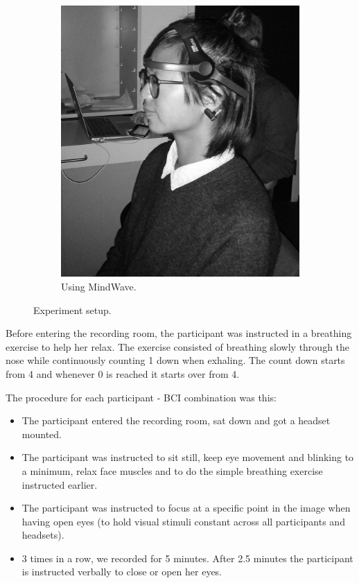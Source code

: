 \documentclass[a4paper,10pt,english,lof,lot,twoside]{puthesis}
\begin{document}
\begin{figure}
\begin{subfigure}[t]{0.35\linewidth}
\includegraphics[width=0.700\linewidth]{experiment-setup-w-mindwave.jpg}
\caption[Using MindWave.]{Using MindWave.}\label{ch-experiment/index:fig-experiment-setup-w-mindwave}\end{subfigure}
\caption[Experiment setup]{Experiment setup.}\label{ch-experiment/index:fig-experiment-setup}

\end{figure}


Before entering the recording room, the participant was instructed in a
breathing exercise to help her relax. The exercise consisted of breathing slowly
through the nose while continuously counting 1 down when exhaling. The count
down starts from 4 and whenever 0 is reached it starts over from 4.

The procedure for each participant - BCI combination was this:
\begin{itemize}
\item {} 
The participant entered the recording room, sat down and got a headset mounted.

\item {} 
The participant was instructed to sit still, keep eye movement and
blinking to a minimum, relax face muscles and to do the simple
breathing exercise instructed earlier.

\item {} 
The participant was instructed to focus at a specific point in the image
when having open eyes (to hold visual stimuli constant across all participants and
headsets).

\item {} 
3 times in a row, we recorded for 5 minutes. After 2.5 minutes
the participant is instructed verbally to close or open her eyes.

\end{itemize}
\end{document}
